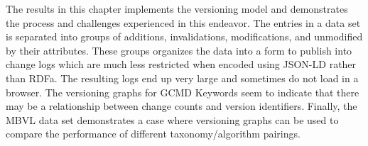 The results in this chapter implements the versioning model and demonstrates the process and challenges experienced in this endeavor.
The entries in a data set is separated into groups of additions, invalidations, modifications, and unmodified by their attributes.
These groups organizes the data into a form to publish into change logs which are much less restricted when encoded using JSON-LD rather than RDFa.
The resulting logs end up very large and sometimes do not load in a browser.
The versioning graphs for GCMD Keywords seem to indicate that there may be a relationship between change counts and version identifiers.
Finally, the MBVL data set demonstrates a case where versioning graphs can be used to compare the performance of different taxonomy/algorithm pairings.